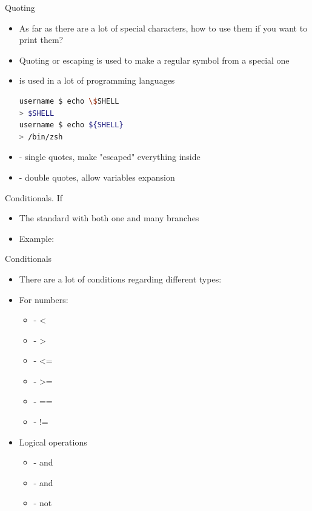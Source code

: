 \documentclass[usenames,dvipsnames,10pt,aspectratio=169]{beamer}
\begin{document}
\begin{frame}[fragile]{Quoting}
    \begin{itemize}
        \item As far as there are a lot of special characters, how to use them if you want to print them?
        \item Quoting or escaping is used to make a regular symbol from a special one
        \item \ex{\textbackslash} is used in a lot of programming languages
        \begin{lstlisting}[language=Bash, style=shellstyle]
username $ echo \$SHELL
> $SHELL
username $ echo ${SHELL}
> /bin/zsh \end{lstlisting}
        \item {} - single quotes, make "escaped" everything inside
        \item {} - double quotes, allow variables expansion
    \end{itemize}
\end{frame}

\begin{frame}{Conditionals. If}
    \begin{itemize}
        \item The standard  with both one and many branches
        
        \item Example:
        
    \end{itemize}
\end{frame}

\begin{frame}{Conditionals}
    \begin{itemize}
        \item There are a lot of conditions regarding different types:
        \item For numbers:
        \begin{itemize}
            \item {} - <
            \item {} - >
            \item {} - <=
            \item {} - >=
            \item {} - ==
            \item {} - !=
        \end{itemize}
        \item Logical operations
        \begin{itemize}
            \item {} - and
            \item {} - and
            \item \ex{!} - not
        \end{itemize}
    \end{itemize}
\end{frame}
\end{document}
